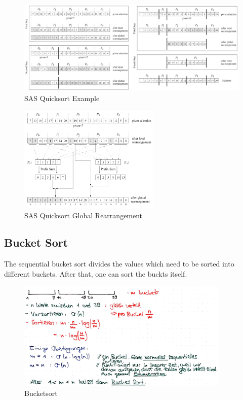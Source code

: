 \begin{figure}[H]
\centering
\includegraphics[width=1\textwidth]{figures/quicksortSASExample.png}
\caption{SAS Quicksort Example}
\end{figure}

\begin{figure}[H]
\centering
\includegraphics[width=0.6\textwidth]{figures/sasQuicksortGlobalRearrangement.png}
\caption{SAS Quicksort Global Rearrangement}
\end{figure}

\hypertarget{bucket-sort}{%
\subsection{Bucket Sort}\label{bucket-sort}}

The sequential bucket sort divides the values which need to be sorted
into different buckets. After that, one can sort the buckts itself.

\begin{figure}[H]
\centering
\includegraphics[width=0.9\textwidth]{figures/bucket-sort.png}
\caption{Bucketsort}
\end{figure}

